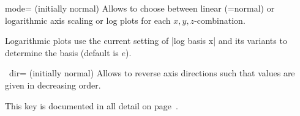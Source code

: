 \begin{pgfplotsxykey}{\x mode= (initially normal)}
    Allows to choose between linear (=normal) or logarithmic axis scaling or
    log plots for each $x,y,z$-combination.

    Logarithmic plots use the current setting of |log basis x| and its variants
    to determine the basis (default is $e$).
\end{pgfplotsxykey}

{\def\pgfmanualpdflabel#1#2{}
\begin{pgfplotsxykey}{\x\ dir= (initially normal)}
    Allows to reverse axis directions such that values are given in decreasing
    order.

    This key is documented in all detail on page~\pageref{key:pgfplots:xydir}.
\end{pgfplotsxykey}
}

